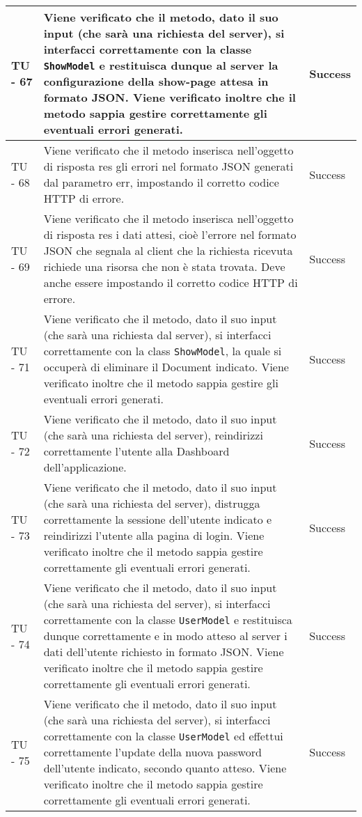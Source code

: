 \begin{center}
\begin{longtable}{ | p{3cm} | p{9cm} | p{2cm} | }
TU - 67 & Viene verificato che il metodo, dato il suo input (che sarà una richiesta del server), si interfacci correttamente con la classe \texttt{ShowModel} e restituisca dunque al server la configurazione della show-page attesa in formato JSON. Viene verificato inoltre che il metodo sappia gestire correttamente gli eventuali errori generati.  & Success \\ \hline
TU - 68 & Viene verificato che il metodo inserisca nell'oggetto di risposta res gli errori nel formato JSON generati dal parametro err, impostando il corretto codice HTTP di errore. & Success \\ \hline
TU - 69 & Viene verificato che il metodo inserisca nell'oggetto di risposta res i dati attesi, cioè l'errore nel formato JSON che segnala al client che la richiesta ricevuta richiede una risorsa che non è stata trovata. Deve anche essere impostando il corretto codice HTTP di errore. & Success \\ \hline
TU - 71 & Viene verificato che il metodo, dato il suo input (che sarà una richiesta dal server), si interfacci correttamente con la class \texttt{ShowModel}, la quale si  occuperà di eliminare il Document indicato. Viene verificato inoltre che il metodo sappia gestire gli eventuali errori generati. & Success \\ \hline
TU - 72 & Viene verificato che il metodo, dato il suo input (che sarà una richiesta del server), reindirizzi correttamente l'utente alla Dashboard dell'applicazione. & Success \\ \hline
TU - 73 & Viene verificato che il metodo, dato il suo input (che sarà una richiesta del server), distrugga correttamente la sessione dell'utente indicato e reindirizzi l'utente alla pagina di login. Viene verificato inoltre che il metodo sappia gestire correttamente gli eventuali errori generati. & Success \\ \hline
TU - 74 & Viene verificato che il metodo, dato il suo input (che sarà una richiesta del server), si interfacci correttamente con la classe \texttt{UserModel} e restituisca dunque correttamente e in modo atteso al server i dati dell'utente richiesto in formato JSON. Viene verificato inoltre che il metodo sappia gestire correttamente gli eventuali errori generati. & Success \\ \hline
TU - 75 & Viene verificato che il metodo, dato il suo input (che sarà una richiesta del server), si interfacci correttamente con la classe \texttt{UserModel} ed effettui correttamente l'update della nuova password dell'utente indicato, secondo quanto atteso. Viene verificato inoltre che il metodo sappia gestire correttamente gli eventuali errori generati. & Success \\ \hline

\end{longtable}
\end{center}
